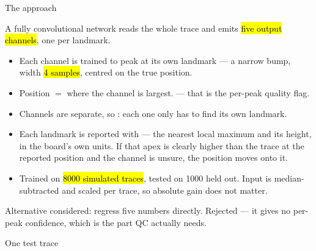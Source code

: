 \begin{frame}{The approach}
  \vspace{0pt}\par
  {\small A fully convolutional network reads the whole trace and emits
   \hl{five output channels}, one per landmark.}
  \par\vspace{4pt}
  \begin{itemize}
    \item Each channel is trained to peak at its own landmark --- a narrow bump,
          width \hl{4 samples}, centred on the true position.
    \item Position $=$ where the channel is largest.  --- that is the per-peak quality flag.
    \item Channels are separate, so : each
          one only has to find its own landmark.
    \item Each landmark is reported with  --- the
          nearest local maximum and its height, in the board's own units. If
          that apex is clearly higher than the trace at the reported position
          and the channel is unsure, the position moves onto it.
    \item Trained on \hl{8000 simulated traces}, tested on 1000 held out.
          Input is median-subtracted and scaled per trace, so absolute gain
          does not matter.
  \end{itemize}
  \vfill
  {\tiny\color{lightgrey} Alternative considered: regress five numbers directly. Rejected ---
   it gives no per-peak confidence, which is the part QC actually needs.}
\end{frame}

\begin{frame}{One test trace}
\end{frame}


